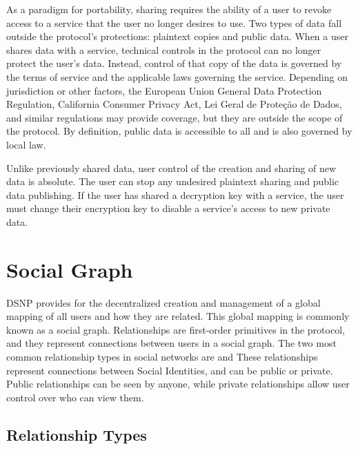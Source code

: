 \documentclass[12pt,letterpaper]{article}
\begin{document}
As a paradigm for portability, sharing requires the ability of a user to revoke access to
a service that the user no longer desires to use. Two types of data fall outside the
protocol's protections: plaintext copies and public data. When a user shares data with a
service, technical controls in the protocol can no longer protect the user's data.
Instead, control of that copy of the data is governed by the terms of service and the
applicable laws governing the service. Depending on jurisdiction or other factors, the
European Union General Data Protection Regulation,\cite{gdpr2016} California Consumer
Privacy Act,\cite{ccpa2018} Lei Geral de Proteção de Dados,\cite{lgpd2019} and similar
regulations may provide coverage, but they are outside the scope of the protocol. By
definition, public data is accessible to all and is also governed by local law.

Unlike previously shared data, user control of the creation and sharing of new data is
absolute. The user can stop any undesired plaintext sharing and public data publishing. If
the user has shared a decryption key with a service, the user must change their encryption
key to disable a service's access to new private data.

\section{Social Graph}\label{sec:social_graph}

DSNP provides for the decentralized creation and management of a global mapping of all
users and how they are related. This global mapping is commonly known as a social graph.
Relationships are first-order primitives in the protocol, and they represent connections
between users in a social graph. The two most common relationship types in social networks
are  and  These relationships represent connections between
Social Identities, and can be public or private. Public relationships can be seen by
anyone, while private relationships allow user control over who can view them.

\subsection{Relationship Types}\label{sec:relationship_types}
\end{document}

